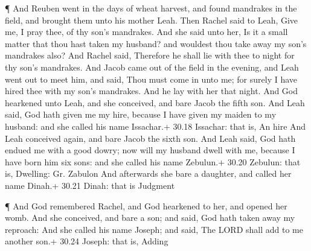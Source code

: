  ¶ And Reuben went in the days of wheat harvest, and found
mandrakes in the field, and brought them unto his mother Leah. Then
Rachel said to Leah, Give me, I pray thee, of thy son's mandrakes.
 And she said unto her, Is it a small matter that thou hast
taken my husband? and wouldest thou take away my son's mandrakes also?
And Rachel said, Therefore he shall lie with thee to night for thy son's
mandrakes.  And Jacob came out of the field in the evening,
and Leah went out to meet him, and said, Thou must come in unto me; for
surely I have hired thee with my son's mandrakes. And he lay with her
that night.  And God hearkened unto Leah, and she
conceived, and bare Jacob the fifth son.  And Leah said,
God hath given me my hire, because I have given my maiden to my husband:
and she called his name Issachar.+ 30.18 Issachar: that is, An hire
 And Leah conceived again, and bare Jacob the sixth son.
 And Leah said, God hath endued me with a good dowry; now
will my husband dwell with me, because I have born him six sons: and she
called his name Zebulun.+ 30.20 Zebulun: that is, Dwelling: Gr. Zabulon
 And afterwards she bare a daughter, and called her name
Dinah.+ 30.21 Dinah: that is Judgment

 ¶ And God remembered Rachel, and God hearkened to her, and
opened her womb.  And she conceived, and bare a son; and
said, God hath taken away my reproach:  And she called his
name Joseph; and said, The LORD shall add to me another son.+ 30.24
Joseph: that is, Adding

